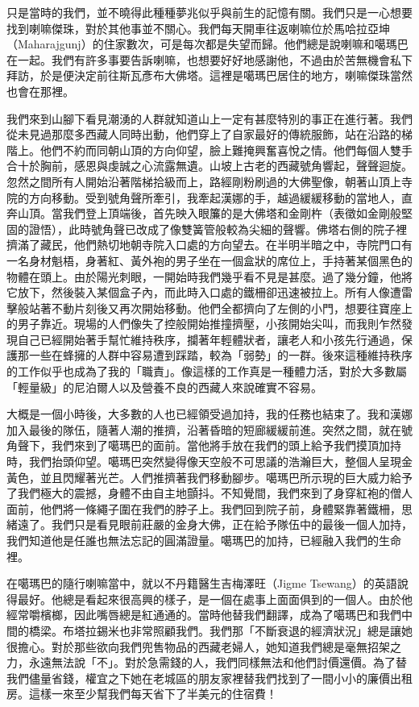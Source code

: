 只是當時的我們，並不曉得此種種夢兆似乎與前生的記憶有關。我們只是一心想要找到喇嘛傑珠，對於其他事並不關心。我們每天開車往返喇嘛位於馬哈拉亞坤（Maharajgunj）的住家數次，可是每次都是失望而歸。他們總是說喇嘛和噶瑪巴在一起。我們有許多事要告訴喇嘛，也想要好好地感謝他，不過由於苦無機會私下拜訪，於是便決定前往斯瓦彥布大佛塔。這裡是噶瑪巴居住的地方，喇嘛傑珠當然也會在那裡。

我們來到山腳下看見潮湧的人群就知道山上一定有甚麼特別的事正在進行著。我們從未見過那麼多西藏人同時出動，他們穿上了自家最好的傳統服飾，站在沿路的梯階上。他們不約而同朝山頂的方向仰望，臉上難掩興奮喜悅之情。他們每個人雙手合十於胸前，感恩與虔誠之心流露無遺。山坡上古老的西藏號角響起，聲聲迴旋。忽然之間所有人開始沿著階梯拾級而上，路經剛粉刷過的大佛聖像，朝著山頂上寺院的方向移動。受到號角聲所牽引，我牽起漢娜的手，越過緩緩移動的當地人，直奔山頂。當我們登上頂端後，首先映入眼簾的是大佛塔和金剛杵（表徵如金剛般堅固的證悟），此時號角聲已改成了像雙簧管般較為尖細的聲響。佛塔右側的院子裡擠滿了藏民，他們熱切地朝寺院入口處的方向望去。在半明半暗之中，寺院門口有一名身材魁梧，身著紅、黃外袍的男子坐在一個盒狀的席位上，手持著某個黑色的物體在頭上。由於陽光刺眼，一開始時我們幾乎看不見是甚麼。過了幾分鐘，他將它放下，然後裝入某個盒子內，而此時入口處的鐵柵卻迅速被拉上。所有人像遭雷擊般站著不動片刻後又再次開始移動。他們全都擠向了左側的小門，想要往寶座上的男子靠近。現場的人們像失了控般開始推撞擠壓，小孩開始尖叫，而我則乍然發現自己已經開始著手幫忙維持秩序，攔著年輕體狀者，讓老人和小孩先行通過，保護那一些在蜂擁的人群中容易遭到踩踏，較為「弱勢」的一群。後來這種維持秩序的工作似乎也成為了我的「職責」。像這樣的工作真是一種體力活，對於大多數屬「輕量級」的尼泊爾人以及營養不良的西藏人來說確實不容易。

大概是一個小時後，大多數的人也已經領受過加持，我的任務也結束了。我和漢娜加入最後的隊伍，隨著人潮的推擠，沿著昏暗的短廊緩緩前進。突然之間，就在號角聲下，我們來到了噶瑪巴的面前。當他將手放在我們的頭上給予我們摸頂加持時，我們抬頭仰望。噶瑪巴突然變得像天空般不可思議的浩瀚巨大，整個人呈現金黃色，並且閃耀著光芒。人們推擠著我們移動腳步。噶瑪巴所示現的巨大威力給予了我們極大的震撼，身體不由自主地顫抖。不知覺間，我們來到了身穿紅袍的僧人面前，他們將一條繩子圍在我們的脖子上。我們回到院子前，身體緊靠著鐵柵，思緒遠了。我們只是看見眼前莊嚴的金身大佛，正在給予隊伍中的最後一個人加持，我們知道他是任誰也無法忘記的圓滿證量。噶瑪巴的加持，已經融入我們的生命裡。

在噶瑪巴的隨行喇嘛當中，就以不丹籍醫生吉梅澤旺（Jigme
Tsewang）的英語說得最好。他總是看起來很高興的樣子，是一個在處事上面面俱到的一個人。由於他經常嚼檳榔，因此嘴唇總是紅通通的。當時他替我們翻譯，成為了噶瑪巴和我們中間的橋梁。布塔拉錫米也非常照顧我們。我們那「不斷衰退的經濟狀況」總是讓她很擔心。對於那些欲向我們兜售物品的西藏老婦人，她知道我們總是毫無招架之力，永遠無法說「不」。對於急需錢的人，我們同樣無法和他們討價還價。為了替我們儘量省錢，權宜之下她在老城區的朋友家裡替我們找到了一間小小的廉價出租房。這樣一來至少幫我們每天省下了半美元的住宿費！

